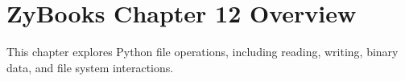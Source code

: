 \chapter{ZyBooks Chapter 12 Overview}
This chapter explores Python file operations, including reading, writing,
binary data, and file system interactions.

